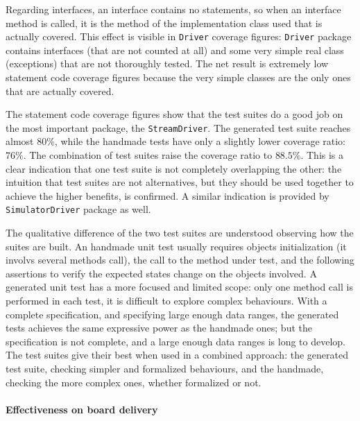 \documentclass[english]{lni}
\newcommand{\lil}[1]{\texttt{\lstinline|#1|}}
\begin{document}
Regarding interfaces, an interface contains no statements, so when an interface method is called, it is the method of the implementation class used that is actually covered.
This effect is visible in \lil{Driver} coverage figures: \lil{Driver} package contains interfaces (that are not counted at all) and some very simple real class (exceptions) that are not thoroughly tested. 
The net result is extremely low statement code coverage figures because the very simple classes are the only ones that are actually covered. 

The statement code coverage figures show that the test suites do a good job on the most important package, the \lil{StreamDriver}. 
The generated test suite reaches almost $ 80 \% $, while the handmade tests have only a slightly lower coverage ratio: $ 76 \% $. 
The combination of test suites raise the coverage ratio to $ 88.5 \% $. 
This is a clear indication that one test suite is not completely overlapping the other: the intuition that test suites are not alternatives, but they should be used together to achieve the higher benefits, is confirmed.
A similar indication is provided by \lil{SimulatorDriver} package as well.

The qualitative difference of the two test suites are understood observing how the suites are built. 
An handmade unit test usually requires objects initialization (it involvs several methods call), the call to the method under test, and the following assertions to verify the expected states change on the objects involved. 
A generated unit test has a more focused and limited scope: only one method call is performed in each test, it is difficult to explore complex behaviours. 
With a complete specification, and specifying large enough data ranges, the generated tests achieves the same expressive power as the handmade ones; but the specification is not complete, and a large enough data ranges is long to develop.
The test suites give their best when used in a combined approach: the generated test suite, checking simpler and formalized behaviours, and the handmade, checking the more complex ones, whether formalized or not.  



\paragraph*{Effectiveness on board delivery}
\end{document}
